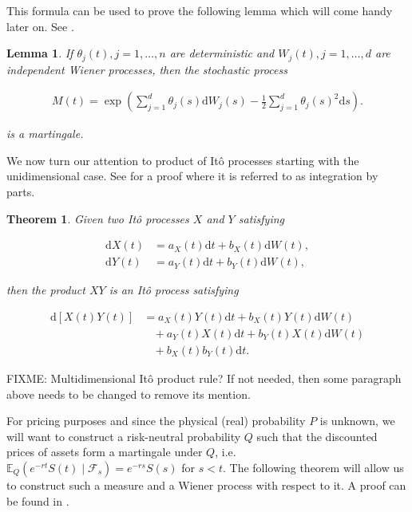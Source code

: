 \documentclass[a4paper]{article}
\newtheorem{lemma}[definition]{Lemma}
\newtheorem{theorem}[definition]{Theorem}
\begin{document}
This formula can be used to prove the following lemma which will come handy later on. See \textcite{capinski_blackscholes_2012}.

\begin{lemma}\label{thm:exp-sums-martingale}
  If $\theta_j(t), j=1,\ldots,n$ are deterministic and $W_j(t), j=1,\ldots,d$ are independent Wiener processes, then the stochastic process

  \begin{align*}
    M(t) = \exp \left( \sum_{j=1}^{d} \theta_j(s) \mathrm{d}W_j(s) - \frac{1}{2} \sum_{j=1}^{d} \theta_j(s)^2 \mathrm{d}s \right).
  \end{align*}

  is a martingale.
\end{lemma}

We now turn our attention to product of It\^o processes starting with the unidimensional case. See \textcite{capinski_stochastic_2012} for a proof where it is referred to as integration by parts.

\begin{theorem}
  Given two It\^o processes $X$ and $Y$ satisfying

  \begin{align*}
    \mathrm{d}X(t) &= a_X(t) \mathrm{d}t + b_X(t) \mathrm{d}W(t),\\
    \mathrm{d}Y(t) &= a_Y(t) \mathrm{d}t + b_Y(t) \mathrm{d}W(t),
  \end{align*}

  then the product $XY$ is an It\^o process satisfying

  \begin{align*}
    \mathrm{d}[X(t) Y(t)]
    &= a_X(t) Y(t) \mathrm{d}t + b_X(t) Y(t) \mathrm{d}W(t)\\
    &\ \ \ \ + a_Y(t) X(t) \mathrm{d}t + b_Y(t) X(t) \mathrm{d}W(t)\\
    &\ \ \ \ + b_X(t) b_Y(t) \mathrm{d}t.
  \end{align*}
\end{theorem}

FIXME: Multidimensional It\^o product rule? If not needed, then some paragraph above needs to be changed to remove its mention.

For pricing purposes and since the physical (real) probability $P$ is unknown, we will want to construct a risk-neutral probability $Q$ such that the discounted prices of assets form a martingale under $Q$, i.e. $\mathbb{E}_Q(e^{-rt}S(t) \mid \mathcal{F}_s) = e^{-rs}S(s)$ for $s < t$. The following theorem will allow us to construct such a measure and a Wiener process with respect to it. A proof can be found in \textcite{capinski_blackscholes_2012}.
\end{document}
